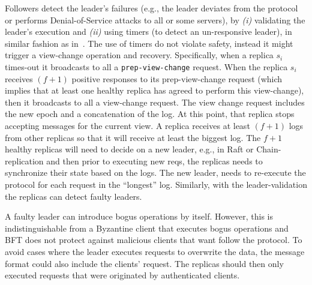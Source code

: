 Followers detect the leader's failures (e.g., the leader deviates from the protocol or performs Denial-of-Service attacks to all or some servers), by \emph{(i)} validating the leader's execution and \emph{(ii)} using timers (to detect an un-responsive leader), in similar fashion as in~\cite{Veronese2013EfficientBF, Castro:2002, 10.1007/978-3-642-35476-2_24}. The use of timers do not violate safety, instead it might trigger a view-change operation and recovery. Specifically, when a replica $s_i$ times-out it broadcasts to all a \texttt{prep-view-change} request. When the replica $s_i$ receives $(f+1)$ positive responses to its prep-view-change request (which implies that at least one healthy replica has agreed to perform this view-change), then it broadcasts to all a view-change request. The view change request includes the new epoch and a concatenation of the log. At this point, that replica stops accepting
messages for the current view. A replica receives at least $(f+1)$ logs from other replicas so that it will receive at least the biggest log. The $f+1$ healthy replicas will need to decide on a new leader, e.g., in Raft or Chain-replication and then prior to executing new reqs, the replicas needs to synchronize their state based on the logs. The new leader, needs to re-execute the protocol for each request in the ``longest'' log. Similarly, with the leader-validation the replicas can detect faulty leaders.




A faulty leader can introduce bogus operations by itself. However, this is indistinguishable from a Byzantine client that executes bogus operations and BFT does not protect against malicious clients that want follow the protocol. To avoid cases where the leader executes requests to overwrite the data, the message format could also include the clients' request. The replicas should then only executed requests that were originated by authenticated clients.

\fi